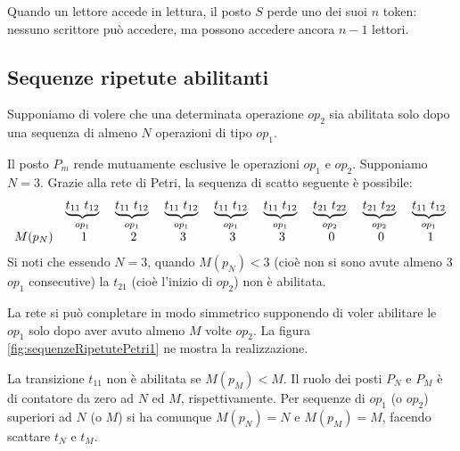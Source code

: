 \documentclass[a4paper]{report}
\begin{document}
Quando un lettore accede in lettura, il posto $S$ perde uno dei suoi
$n$ token: nessuno scrittore pu\`o accedere, ma possono accedere
ancora $n - 1$ lettori.

\subsection{Sequenze ripetute abilitanti}
Supponiamo di volere che una determinata operazione $op_2$ sia
abilitata solo dopo una sequenza di almeno $N$ operazioni di tipo
$op_1$.

Il posto $P_m$ rende mutuamente esclusive le operazioni $op_1$ e
$op_2$. Supponiamo $N = 3$. Grazie alla rete di Petri, la sequenza di
scatto seguente \`e possibile:
\[
\begin{array}{c c c c c c c c c}
  &
  \underbrace{t_{11} \; t_{12}}_\text{$op_1$}\; &
  \underbrace{t_{11} \; t_{12}}_\text{$op_1$}\; &
  \underbrace{t_{11} \; t_{12}}_\text{$op_1$}\; &
  \underbrace{t_{11} \; t_{12}}_\text{$op_1$}\; &
  \underbrace{t_{11} \; t_{12}}_\text{$op_1$}\; &
  \underbrace{t_{21} \; t_{22}}_\text{$op_2$}\; &
  \underbrace{t_{21} \; t_{22}}_\text{$op_2$}\; &
  \underbrace{t_{11} \; t_{12}}_\text{$op_1$}\; \\
  M(p_N) &
  1 &
  2 &
  3 &
  3 &
  3 &
  0 &
  0 &
  1
\end{array}
\]
Si noti che essendo $N = 3$, quando $M(p_N) < 3$ (cio\`e non si sono
avute almeno 3 $op_1$ consecutive) la $t_{21}$ (cio\`e l'inizio di
$op_2$) non \`e abilitata.

La rete si pu\`o completare in modo simmetrico supponendo di voler
abilitare le $op_1$ solo dopo aver avuto almeno $M$ volte $op_2$. La
figura \ref{fig:sequenzeRipetutePetri1} ne mostra la realizzazione.


La transizione $t_{11}$ non \`e abilitata se $M(p_M) < M$.
Il ruolo dei posti $P_N$ e $P_M$ \`e di contatore da zero ad $N$ ed
$M$, rispettivamente. Per sequenze di $op_1$ (o $op_2$) superiori ad
$N$ (o $M$) si ha comunque $M(p_N) = N$ e $M(p_M) = M$, facendo
scattare $t_N$ e $t_M$.
\end{document}

